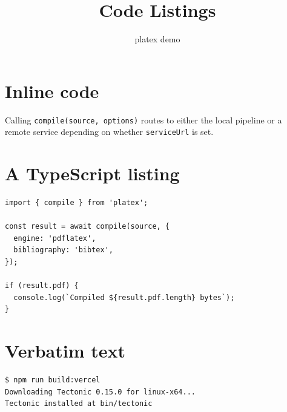 \documentclass{article}
\title{Code Listings}
\author{platex demo}
\date{}
\begin{document}
\maketitle

\section{Inline code}
Calling \texttt{compile(source, options)} routes to either the local
pipeline or a remote service depending on whether \texttt{serviceUrl} is set.

\section{A TypeScript listing}
\begin{lstlisting}
import { compile } from 'platex';

const result = await compile(source, {
  engine: 'pdflatex',
  bibliography: 'bibtex',
});

if (result.pdf) {
  console.log(`Compiled ${result.pdf.length} bytes`);
}
\end{lstlisting}

\section{Verbatim text}
\begin{verbatim}
$ npm run build:vercel
Downloading Tectonic 0.15.0 for linux-x64...
Tectonic installed at bin/tectonic
\end{verbatim}
\end{document}
